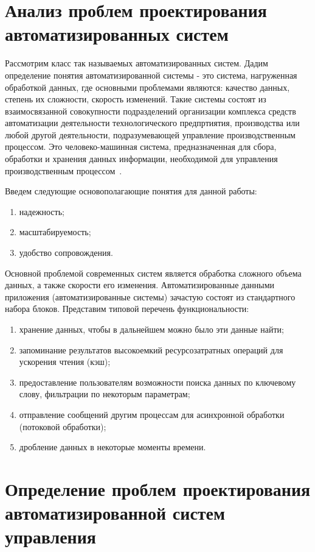 \section{Анализ проблем проектирования автоматизированных систем}\label{sec:ch1/sec3}
Рассмотрим класс так называемых автоматизированных систем. Дадим определение понятия автоматизированной системы - это система, нагруженная обработкой данных, где основными проблемами являются: качество данных, степень их сложности, скорость изменений. Такие системы состоят из взаимосвязанной совокупности подразделений организации комплекса средств автоматизации деятельности технологического предпртиятия, производства или любой другой деятельности, подразумевающей управление производственным процессом. Это человеко-машинная система, предназначенная для сбора, обработки и хранения данных информации, необходимой для управления производственным процессом~\cite{Ref1, Ref2, Ref3, Ref4,Ref5,Ref6,Ref7, Ref8, Ref9, Ref10,Ref11,Ref12}.

Введем следующие основополагающие понятия для данной работы:
\begin{enumerate}
    \item  надежность;
    \item  масштабируемость;
    \item  удобство сопровождения.
\end{enumerate}


Основной проблемой современных систем является обработка сложного объема данных, а также скорости его изменения. Автоматизированные данными приложения (автоматизированные системы) зачастую состоят из стандартного набора блоков. Представим типовой перечень функциональности:
\begin{enumerate}
    \item  хранение данных, чтобы в дальнейшем можно было эти данные найти;
    \item  запоминание результатов высокоемкий ресурсозатратных операций для ускорения чтения (кэш);
    \item  предоставление пользователям возможности поиска данных по ключевому слову, фильтрации по некоторым параметрам;
    \item  отправление сообщений другим процессам для асинхронной обработки (потоковой обработки);
    \item  дробление данных в некоторые моменты времени.
\end{enumerate}

\section{Определение проблем проектирования автоматизированной систем управления}\label{sec:ch1/sec4}

